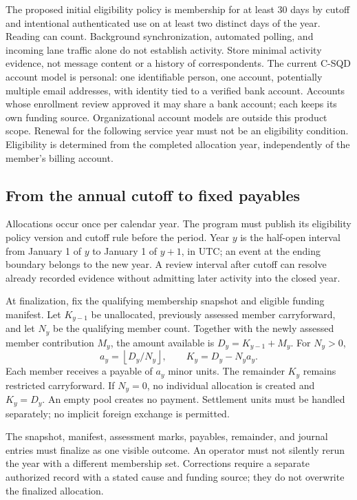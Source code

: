 \documentclass[11pt]{article}
\begin{document}
The proposed initial eligibility policy is membership for at least 30 days by
cutoff and intentional authenticated use on at least two distinct days of the
year. Reading can count. Background synchronization, automated polling, and
incoming lane traffic alone do not establish activity. Store minimal activity
evidence, not message content or a history of correspondents. The current
C-SQD account model is personal: one identifiable person, one account, potentially
multiple email addresses, with identity tied to a verified bank account. Accounts
whose enrollment review approved it may share a bank account; each keeps its own
funding source.
Organizational account models are outside this product scope. Renewal for the following service
year must not be an eligibility condition. Eligibility is determined from the
completed allocation year, independently of the member's billing account.

\subsection{From the annual cutoff to fixed payables}

Allocations occur once per calendar year. The program must publish its eligibility
policy version and cutoff rule before the period. Year $y$ is the half-open
interval from January 1 of $y$ to January 1 of $y+1$, in UTC; an event at the
ending boundary belongs to the new year. A review interval after cutoff can
resolve already recorded evidence without admitting later activity into the
closed year.

At finalization, fix the qualifying membership snapshot and eligible funding
manifest. Let $K_{y-1}$ be unallocated, previously assessed member carryforward,
and let $N_y$ be the qualifying member count. Together with the newly assessed
member contribution $M_y$, the amount available is $D_y=K_{y-1}+M_y$.
For $N_y>0$,
\[
a_y=\left\lfloor D_y/N_y\right\rfloor,
\qquad K_y=D_y-N_y a_y.
\]
Each member receives a payable of $a_y$ minor units. The remainder $K_y$ remains
restricted carryforward. If $N_y=0$, no individual allocation is created and
$K_y=D_y$. An empty pool creates no payment. Settlement units must be handled
separately; no implicit foreign exchange is permitted.

The snapshot, manifest, assessment marks, payables, remainder, and journal entries
must finalize as one visible outcome. An operator must not silently rerun the
year with a different membership set. Corrections require a separate authorized
record with a stated cause and funding source; they do not overwrite the
finalized allocation.
\end{document}
